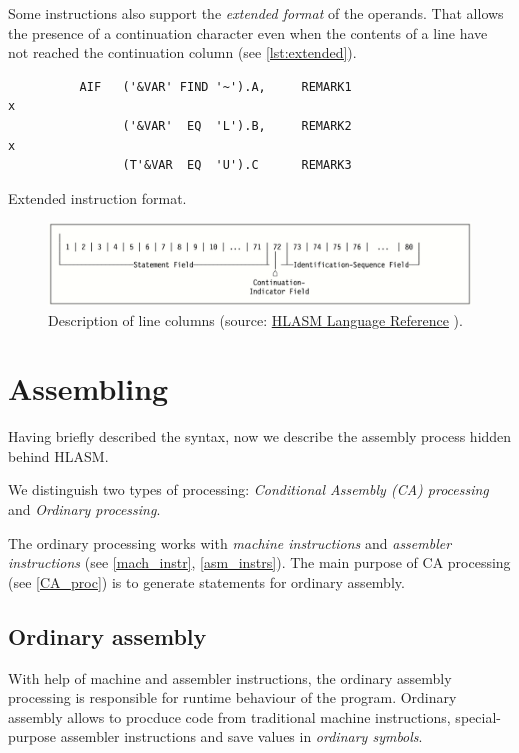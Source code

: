 Some instructions also support the \emph{extended format} of the operands. That allows the presence of a continuation character even when the contents of a line have not reached the continuation column (see \cref{lst:extended}).

\begin{listing}[t]
	\begin{verbatim}
          AIF   ('&VAR' FIND '~').A,     REMARK1                        x
                ('&VAR'  EQ  'L').B,     REMARK2                        x
                (T'&VAR  EQ  'U').C      REMARK3 
	\end{verbatim}
	\caption{Extended instruction format.}
	\label{lst:extended}
\end{listing}

\begin{figure}
	\includegraphics[width=\textwidth]{img/line}
	\caption{Description of line columns (source: \href{https://www-01.ibm.com/servers/resourcelink/svc00100.nsf/pages/zOSV2R3sc264940/$file/asmr1023.pdf}{HLASM Language Reference} ).}
	\label{fig01:line}
\end{figure}


\section{Assembling}
\label{Assembling}

Having briefly described the syntax, now we describe the assembly process hidden behind HLASM. 

We distinguish two types of processing: \emph{Conditional Assembly (CA) processing} and \emph{Ordinary processing}.

The ordinary processing works with \emph{machine instructions} and \emph{assembler instructions} (see \cref{mach_instr}, \cref{asm_instrs}). The main purpose of CA processing (see \cref{CA_proc}) is to generate statements for ordinary assembly.

\subsection{Ordinary assembly}

With help of machine and assembler instructions, the ordinary assembly processing is responsible for runtime behaviour of the program. Ordinary assembly allows to procduce code from traditional machine instructions, special-purpose assembler instructions and save values in \emph{ordinary symbols}.

